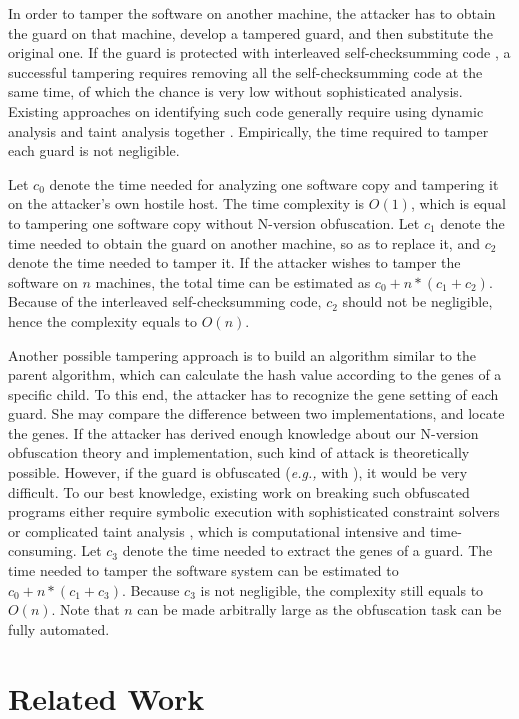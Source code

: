 \documentclass[10pt, conference]{IEEEtran}
\begin{document}
In order to tamper the software on another machine, the attacker has to obtain the guard on that machine, develop a tampered guard, and then substitute the original one.  If the guard is protected with interleaved self-checksumming code \cite{chang2002protecting}, a successful tampering requires removing all the self-checksumming code at the same time, of which the chance is very low without sophisticated analysis.  Existing approaches on identifying such code generally require using dynamic analysis and taint analysis together \cite{qiu2014framework}.  Empirically, the time required to tamper each guard is not negligible.

Let $c_0$ denote the time needed for analyzing one software copy and tampering it on the attacker's own hostile host.  The time complexity is $O(1)$, which is equal to tampering one software copy without N-version obfuscation.  Let $c_1$ denote the time needed to obtain the guard on another machine, so as to replace it, and $c_2$ denote the time needed to tamper it.  If the attacker wishes to tamper the software on $n$ machines, the total time can be estimated as $c_0 + n * (c_1 + c_2)$.  Because of the interleaved self-checksumming code, $c_2$ should not be negligible, hence the complexity equals to $O(n)$. 

Another possible tampering approach is to build an algorithm similar to the parent algorithm, which can calculate the hash value according to the genes of a specific child.  To this end, the attacker has to recognize the gene setting of each guard.  She may compare the difference between two implementations, and locate the genes.  If the attacker has derived enough knowledge about our N-version obfuscation theory and implementation, such kind of attack is theoretically possible.  However, if the guard is obfuscated (\textit{e.g.,} with \cite{ogiso2003software}), it would be very difficult.  To our best knowledge, existing work on breaking such obfuscated programs either require symbolic execution with sophisticated constraint solvers or complicated taint analysis \cite{yadegari2015generic}, which is computational intensive and time-consuming.  Let $c_3$ denote the time needed to extract the genes of a guard.  The time needed to tamper the software system can be estimated to $c_0 + n * (c_1 + c_3)$.  Because $c_3$ is not negligible, the complexity still equals to $O(n)$.  Note that $n$ can be made arbitrally large as the obfuscation task can be fully automated.

\section{Related Work} \label{section:literature}
\end{document}
